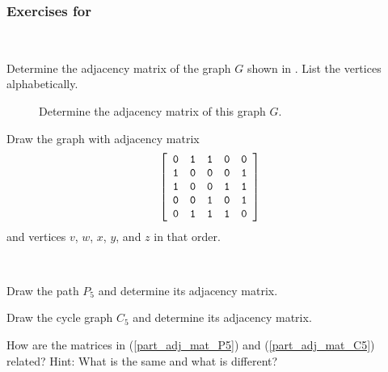 
\subsubsection*{Exercises for 
\subadjmat}

\begin{exer}[\exerP] %
\label{exer_my_first_adj_mat}
~
    \begin{exerpart}
        \item Determine the adjacency matrix of the graph $G$ shown in . List the vertices alphabetically.
            \begin{figure}[hbtp]
                \centering
                
                \caption{Determine the adjacency matrix of this graph $G$.}
                \label{fig_my_first_adj_matrix}
            \end{figure}
                \item Draw the graph with adjacency matrix
            $$\left[ \begin{array} {cccccc} 
                \texttt{0}&\texttt{1}&\texttt{1}&\texttt{0}&\texttt{0} \\
                \texttt{1}&\texttt{0}&\texttt{0}&\texttt{0}&\texttt{1} \\
                \texttt{1}&\texttt{0}&\texttt{0}&\texttt{1}&\texttt{1} \\
                \texttt{0}&\texttt{0}&\texttt{1}&\texttt{0}&\texttt{1} \\
                \texttt{0}&\texttt{1}&\texttt{1}&\texttt{1}&\texttt{0}
            \end{array} \right]$$ 
        and vertices $v$, $w$, $x$, $y$, and $z$ in that order.
    \end{exerpart}
\end{exer}

\begin{exer}[\exerP] %
\label{exer_adj_matrix_P5C5}
~
    \begin{exerpart}    
        \item \label{part_adj_mat_P5} Draw the path $P_5$ and determine its adjacency matrix. 
        \item \label{part_adj_mat_C5} Draw the cycle graph $C_5$ and determine its adjacency matrix. 
        \item \label{part_adj_mat_C5fromP5} How are the matrices in (\ref{part_adj_mat_P5}) and (\ref{part_adj_mat_C5}) related? Hint: What is the same and what is different? 
    \end{exerpart}
\end{exer}

